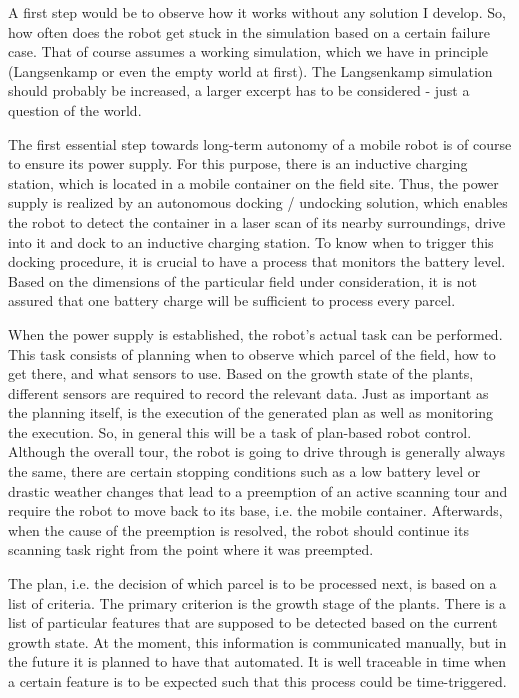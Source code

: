\documentclass[german, master, expose, latin1]{base/thesis_KBS}
\begin{document}
A first step would be to observe how it works without any solution I develop. So, how often does the robot get stuck in the simulation based on a certain failure
case. That of course assumes a working simulation, which we have in principle (Langsenkamp or even the empty world at first). The Langsenkamp simulation should
probably be increased, a larger excerpt has to be considered - just a question of the world.

The first essential step towards long-term autonomy of a mobile robot is of course to ensure its power supply.
For this purpose, there is an inductive charging station, which is located in a mobile container on the field site.
Thus, the power supply is realized by an autonomous docking / undocking solution, which enables the robot to detect the container in a laser scan
of its nearby surroundings, drive into it and dock to an inductive charging station. To know when to trigger this docking procedure, it is crucial 
to have a process that monitors the battery level. Based on the dimensions of the particular field under consideration, it is not assured that one battery 
charge will be sufficient to process every parcel.\newline

When the power supply is established, the robot's actual task can be performed. This task consists of planning when to observe which parcel of the field,
how to get there, and what sensors to use. Based on the growth state of the plants, different sensors are required to record the relevant data.
Just as important as the planning itself, is the execution of the generated plan as well as monitoring the execution.
So, in general this will be a task of plan-based robot control.
Although the overall tour, the robot is going to drive through is generally always the same, there are certain stopping conditions 
such as a low battery level or drastic weather changes that lead to a preemption of an active scanning tour and require the robot 
to move back to its base, i.e. the mobile container. Afterwards, when the cause of the preemption is resolved, 
the robot should continue its scanning task right from the point where it was preempted.\newline

The plan, i.e. the decision of which parcel is to be processed next, is based on a list of criteria. The primary criterion is the growth stage of the plants.
There is a list of particular features that are supposed to be detected based on the current growth state.
At the moment, this information is communicated manually, but in the future it is planned to have that automated.
It is well traceable in time when a certain feature is to be expected such that this process could be time-triggered.\newline
\end{document}
